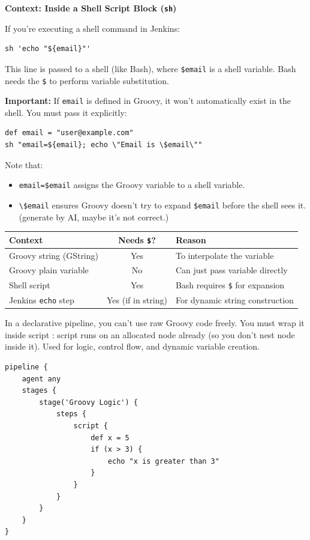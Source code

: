 \documentclass[paper=8.5in:11in, twoside, 12pt, pagesize=pdftex]{book}
\begin{document}
\textbf{Context: Inside a Shell Script Block (\texttt{sh})}

If you're executing a shell command in Jenkins:

\begin{lstlisting}[]
	sh 'echo "${email}"'
\end{lstlisting}

This line is passed to a shell (like Bash), where \texttt{\$email} is a shell variable. Bash needs the \texttt{\$} to perform variable substitution.

\textbf{Important:} If \texttt{email} is defined in Groovy, it won't automatically exist in the shell. You must pass it explicitly:

\begin{lstlisting}[]
def email = "user@example.com"
sh "email=${email}; echo \"Email is \$email\""
\end{lstlisting}

Note that:
\begin{itemize}
	\item \texttt{email=\${email}} assigns the Groovy variable to a shell variable.
	
	\item \texttt{\textbackslash\$email} ensures Groovy doesn't try to expand \texttt{\$email} before the shell sees it. (generate by AI, maybe it's not correct.)
\end{itemize}

\begin{center}
	\begin{tabular}{|l|c|l|}
		\hline
		\textbf{Context} & \textbf{Needs \texttt{\$}?} & \textbf{Reason} \\
		\hline
		Groovy string (GString) & Yes & To interpolate the variable \\
		\hline
		Groovy plain variable   & No  & Can just pass variable directly \\
		\hline
		Shell script            & Yes & Bash requires \texttt{\$} for expansion \\
		\hline
		Jenkins \texttt{echo} step & Yes (if in string) & For dynamic string construction \\
		\hline
	\end{tabular}
\end{center}


In a declarative pipeline, you can’t use raw Groovy code freely. You must wrap it inside script {}: script {} runs on an allocated node already (so you don’t nest node {} inside it). Used for logic, control flow, and dynamic variable creation.
\begin{lstlisting}
pipeline {
	agent any	
	stages {
		stage('Groovy Logic') {
			steps {
				script {
					def x = 5
					if (x > 3) {
						echo "x is greater than 3"
					}
				}
			}
		}
	}
}
\end{lstlisting}
\end{document}
